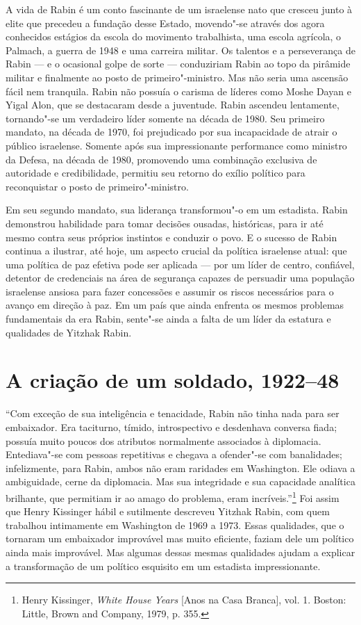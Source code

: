 A vida de Rabin é um conto fascinante de um israelense nato que cresceu
junto à elite que precedeu a fundação desse Estado, movendo"-se através dos agora
conhecidos estágios da escola do movimento trabalhista, uma escola
agrícola, o Palmach, a guerra de 1948 e uma carreira militar. Os
talentos e a perseverança de Rabin --- e o ocasional golpe de sorte ---
conduziriam Rabin ao topo da pirâmide militar e finalmente ao posto de
primeiro"-ministro. Mas não seria uma ascensão fácil nem tranquila. Rabin
não possuía o carisma de líderes como Moshe Dayan e Yigal Alon, que se
destacaram desde a juventude. Rabin ascendeu lentamente, tornando"-se um
verdadeiro líder somente na década de 1980. Seu primeiro mandato, na
década de 1970, foi prejudicado por sua incapacidade de atrair o público
israelense. Somente após sua impressionante performance como ministro da
Defesa, na década de 1980, promovendo uma combinação exclusiva de autoridade e
credibilidade, permitiu seu retorno do exílio político para
reconquistar o posto de primeiro"-ministro.

Em seu segundo mandato, sua liderança transformou"-o em um estadista.
Rabin demonstrou habilidade para tomar decisões ousadas, históricas,
para ir até mesmo contra seus próprios instintos e conduzir o povo. E o
sucesso de Rabin continua a ilustrar, até hoje, um aspecto crucial da
política israelense atual: que uma política de paz efetiva pode ser
aplicada --- por um líder de centro, confiável, detentor de credenciais
na área de segurança capazes de persuadir uma população israelense
ansiosa para fazer concessões e assumir os riscos necessários para o avanço
em direção à paz. Em um país que ainda enfrenta os mesmos problemas
fundamentais da era Rabin, sente"-se ainda a falta de um líder da
estatura e qualidades de Yitzhak Rabin.

\chapter[A criação de um soldado, 1922--48]{A criação de um soldado, 1922--48}

``Com exceção de sua inteligência e tenacidade, Rabin não tinha nada para ser
embaixador. Era taciturno, tímido, introspectivo e desdenhava
conversa fiada; possuía muito poucos dos atributos normalmente
associados à diplomacia. Entediava"-se com pessoas repetitivas e chegava
a ofender"-se com banalidades; infelizmente, para Rabin, ambos não eram
raridades em Washington. Ele odiava a ambiguidade, cerne da diplomacia.
Mas sua integridade e sua capacidade analítica brilhante, que permitiam
ir ao amago do problema, eram incríveis.''\footnote{Henry Kissinger, \emph{White House Years} {[}Anos na Casa Branca{]}, vol. 1. Boston: Little,
Brown and Company, 1979, p. 355.}
Foi assim que Henry Kissinger hábil e sutilmente descreveu Yitzhak
Rabin, com quem trabalhou intimamente em Washington de 1969 a 1973.
Essas qualidades, que o tornaram um embaixador improvável mas muito
eficiente, faziam dele um político ainda mais improvável. Mas algumas
dessas mesmas qualidades ajudam a explicar a transformação de um
político esquisito em um estadista impressionante.

